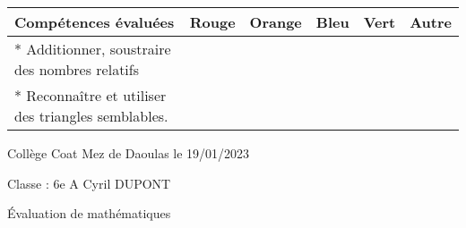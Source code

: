 \documentclass[a4paper,12pt,fleqn]{article}
\begin{document}
\begin{footnotesize}

\begin{center}

\begin{tabular}{|p{120mm}|p{8mm}|p{10mm}|p{8mm}|p{8mm}|p{8mm}|}

\hline
\textbf{Compétences évaluées} & \textbf{Rouge} & \textbf{Orange} & \textbf{Bleu} & \textbf{Vert} & \textbf{Autre} \\
\hline


*  Additionner, soustraire des nombres relatifs  & & & & & \\ 
\hline
*  Reconnaître et utiliser des triangles semblables.  & & & & & \\ 
\hline
\end{tabular}
\end{center}
\end{footnotesize}
 \par 
\medskip
 \par 
\medskip
\newpage
\setcounter{exo}{0}


Collège Coat Mez de Daoulas  \hfill  le 19/01/2023

Classe : 6e A \hfill Cyril DUPONT

\begin{center}
\begin{LARGE} Évaluation de mathématiques \end{LARGE}
\end{center}

\end{document}
